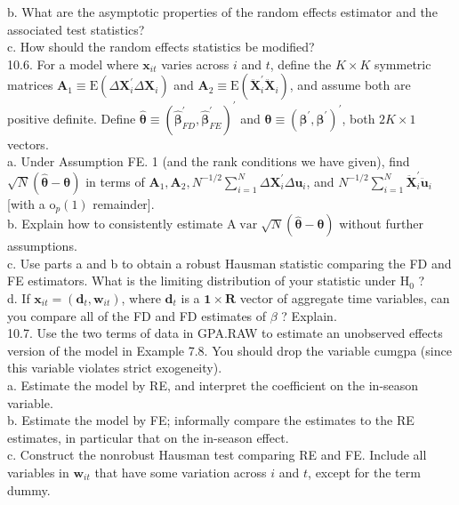 \documentclass[10pt]{article}
\begin{document}
b. What are the asymptotic properties of the random effects estimator and the associated test statistics?\\
c. How should the random effects statistics be modified?\\
10.6. For a model where $\mathbf{x}_{i t}$ varies across $i$ and $t$, define the $K \times K$ symmetric matrices $\mathbf{A}_{1} \equiv \mathrm{E}\left(\Delta \mathbf{X}_{i}^{\prime} \Delta \mathbf{X}_{i}\right)$ and $\mathbf{A}_{2} \equiv \mathrm{E}\left(\ddot{\mathbf{X}}_{i}^{\prime} \ddot{\mathbf{X}}_{i}\right)$, and assume both are positive definite. Define $\hat{\boldsymbol{\theta}} \equiv\left(\hat{\boldsymbol{\beta}}_{F D}^{\prime}, \hat{\boldsymbol{\beta}}_{F E}^{\prime}\right)^{\prime}$ and $\boldsymbol{\theta} \equiv\left(\boldsymbol{\beta}^{\prime}, \boldsymbol{\beta}^{\prime}\right)^{\prime}$, both $2 K \times 1$ vectors.\\
a. Under Assumption FE. 1 (and the rank conditions we have given), find $\sqrt{N}(\hat{\boldsymbol{\theta}}-\boldsymbol{\theta})$ in terms of $\mathbf{A}_{1}, \mathbf{A}_{2}, N^{-1 / 2} \sum_{i=1}^{N} \Delta \mathbf{X}_{i}^{\prime} \Delta \mathbf{u}_{i}$, and $N^{-1 / 2} \sum_{i=1}^{N} \ddot{\mathbf{X}}_{i}^{\prime} \ddot{\mathbf{u}}_{i}$ [with a $\mathrm{o}_{p}(1)$ remainder].\\
b. Explain how to consistently estimate $\mathrm{A} \operatorname{var} \sqrt{N}(\hat{\boldsymbol{\theta}}-\boldsymbol{\theta})$ without further assumptions.\\
c. Use parts a and b to obtain a robust Hausman statistic comparing the FD and FE estimators. What is the limiting distribution of your statistic under $\mathrm{H}_{0}$ ?\\
d. If $\mathbf{x}_{i t}=\left(\mathbf{d}_{t}, \mathbf{w}_{i t}\right)$, where $\mathbf{d}_{t}$ is a $\mathbf{1} \times \boldsymbol{R}$ vector of aggregate time variables, can you compare all of the FD and FD estimates of $\beta$ ? Explain.\\
10.7. Use the two terms of data in GPA.RAW to estimate an unobserved effects version of the model in Example 7.8. You should drop the variable cumgpa (since this variable violates strict exogeneity).\\
a. Estimate the model by RE, and interpret the coefficient on the in-season variable.\\
b. Estimate the model by FE; informally compare the estimates to the RE estimates, in particular that on the in-season effect.\\
c. Construct the nonrobust Hausman test comparing RE and FE. Include all variables in $\mathbf{w}_{i t}$ that have some variation across $i$ and $t$, except for the term dummy.\\
\end{document}
